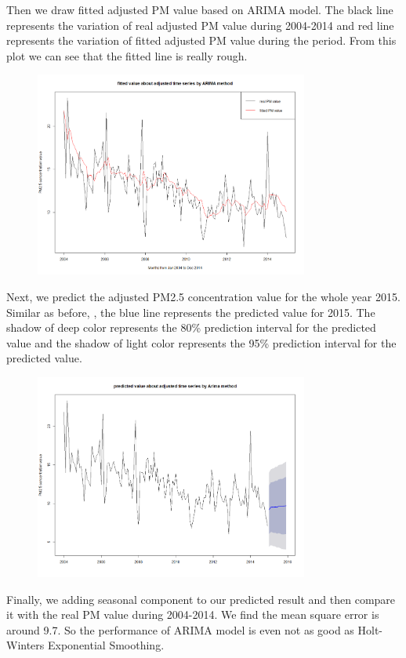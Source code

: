 \documentclass[10pt]{article}
\begin{document}
Then we draw fitted adjusted PM value based on ARIMA model. The black line represents the variation of real adjusted PM value during 2004-2014 and red line represents the variation of fitted adjusted PM value during the period. From this plot we can see that the fitted line is really rough.

\begin{figure}[ht!]
\centering
\includegraphics[width = 90mm]{ts5.png}
\end{figure}

Next, we predict the adjusted PM2.5 concentration value for the whole year 2015. Similar as before, , the blue line represents the predicted value for 2015. The shadow of deep color represents the 80\% prediction interval for the predicted value and the shadow of light color represents the 95\% prediction interval for the predicted value.

\begin{figure}[ht!]
\centering
\includegraphics[width = 90mm]{ts6.png}
\end{figure}

Finally, we adding seasonal component to our predicted result and then compare it with the real PM value during 2004-2014. We find the mean square error is around 9.7. So the performance of ARIMA model is even not as good as Holt-Winters Exponential Smoothing.
\end{document}
